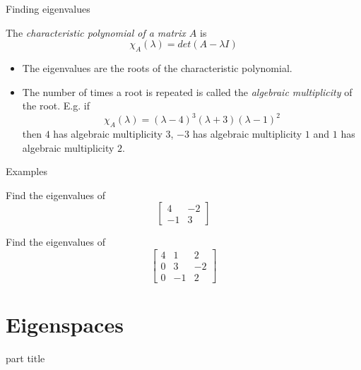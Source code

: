 \documentclass{beamer}
\begin{document}
\begin{frame}{Finding eigenvalues}
\begin{definition}
	The \emph{characteristic polynomial of a matrix $A$} is
	\begin{equation*}
	 	\chi_A(\lambda) = det(A-\lambda I)
	 \end{equation*} 
\end{definition}
\begin{itemize}
	\item The eigenvalues are the roots of the characteristic polynomial.
	\item The number of times a root is repeated is called the \emph{algebraic multiplicity} of the root.
	E.g. if
	\begin{equation*}
		\chi_A(\lambda) = (\lambda-4)^3(\lambda+3)(\lambda-1)^2
	\end{equation*}
	then $4$ has algebraic multiplicity $3$, $-3$ has algebraic multiplicity $1$ and $1$ has algebraic multiplicity $2$.
\end{itemize}
\end{frame}

\begin{frame}{Examples}
\begin{example}
	Find the eigenvalues of
	\begin{equation*}
		\left[
		\begin{matrix}
		4&-2\\
		-1&3
		\end{matrix}
		\right]
	\end{equation*}
\end{example}
\begin{example}
	Find the eigenvalues of
	\begin{equation*}
		\left[
		\begin{matrix}
		4&1&2\\
		0&3&-2\\
		0&-1&2
		\end{matrix}
		\right]
	\end{equation*}
\end{example}
\end{frame}

\section{Eigenspaces}

\begin{frame}
\begin{beamercolorbox}[sep=12pt,center]{part title}
\insertsection\par
\end{beamercolorbox}
\end{frame}
\end{document}
